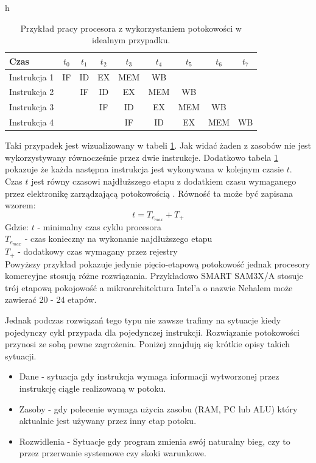 \documentclass[a4paper,12pt]{article}
\begin{document}
\begin{table}{h}
        \centering
        \caption{Przykład pracy procesora z wykorzystaniem potokowości w idealnym przypadku.}
        \label{pipelining}
        \begin{tabular}{lcccccccc}
                Czas & $t_0$&$t_1$&$t_2$&$t_3$&$t_4$&$t_5$&$t_6$&$t_7$ \\ \hline
                Instrukcja 1 & IF & ID & EX & MEM & WB &    & \\
                Instrukcja 2 &    & IF & ID & EX & MEM & WB & \\
                Instrukcja 3 &    &    & IF & ID & EX & MEM & WB \\
                Instrukcja 4 &    &    &    & IF & ID & EX & MEM & WB
        \end{tabular}
\end{table}


Taki przypadek jest wizualizowany w tabeli \ref{pipelining}. Jak widać żaden z zasobów nie jest wykorzystywany równocześnie przez dwie instrukcje.
Dodatkowo tabela \ref{pipelining} pokazuje że każda następna instrukcja jest wykonywana w kolejnym czasie $t$. 
Czas $t$ jest równy czasowi najdłuższego etapu z dodatkiem czasu wymaganego przez elektronikę zarządzającą potokowością \cite{arch}.
Równość ta może być zapisana wzorem:
\begin{equation}
        t = T_{e_{max}} + T_{+}
\end{equation}
Gdzie:
        $t$ - minimalny czas cyklu procesora \\
        $T_{e_{max}}$ - czas konieczny na wykonanie najdłuższego etapu \\
        $T_{+}$ - dodatkowy czas wymagany przez rejestry \\


Powyższy przykład pokazuje jedynie pięcio-etapową potokowość jednak procesory komercyjne stosują różne rozwiązania. Przykładowo SMART SAM3X/A stosuje trój etapową pokojowość\cite{datasheet} a mikroarchitektura Intel'a o nazwie Nehalem może zawierać 20 - 24 etapów\cite{pipelining intel}.

Jednak podczas rozwiązań tego typu nie zawsze trafimy na sytuacje kiedy pojedynczy cykl przypada dla pojedynczej instrukcji. 
Rozwiązanie potokowości przynosi ze sobą pewne zagrożenia. Poniżej znajdują się krótkie opisy takich sytuacji. 

\begin{itemize}
        \item Dane - sytuacja gdy instrukcja wymaga informacji wytworzonej przez instrukcję ciągle realizowaną w potoku. 
        \item Zasoby - gdy polecenie wymaga użycia zasobu (RAM, PC lub ALU) który aktualnie jest używany przez inny etap potoku. 
        \item Rozwidlenia - Sytuacje gdy program zmienia swój naturalny bieg, czy to przez przerwanie systemowe czy skoki warunkowe. 
\end{itemize}
\end{document}
